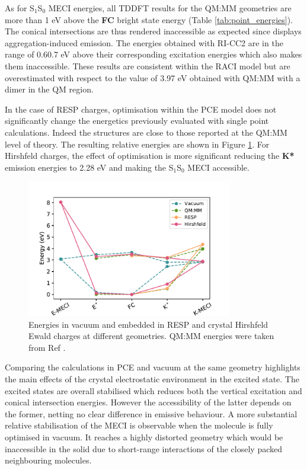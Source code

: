 As for S$_1$\textendash{}S$_0$ MECI energies, all TDDFT results for the QM:MM geometries are more than 1 eV above the \textbf{FC} bright state energy (Table \ref{tab:point_energies}). The conical intersections are thus rendered inaccessible as expected since \HC{} displays aggregation-induced emission. The energies obtained with RI-CC2 are in the range of 0.6\textendash{}0.7 eV above their corresponding excitation energies which also makes them inaccessible. These results are consistent within the RACI model but are overestimated with respect to the value of 3.97 eV obtained with QM:MM with a dimer in the QM region.\cite{Dommett2017c}

In the case of RESP charges, optimisation within the PCE model does not significantly change the energetics previously evaluated with single point calculations. Indeed the structures are close to those reported at the QM:MM level of theory. The resulting relative energies are shown in Figure \ref{fig:pts_n_vac}. For Hirshfeld charges, the effect of optimisation is more significant reducing the \textbf{K*} emission energies to 2.28 eV and making the S$_1$\textendash{}S$_0$ MECI accessible.


\begin{figure}
\centering
\includegraphics[width=9cm]{Chapters/5Ewald/Energies_Figure.pdf}
\caption{Energies \HC{} in vacuum and embedded in RESP and crystal Hirshfeld Ewald charges at different geometries. QM:MM energies were taken from Ref .}
\label{fig:pts_n_vac}
\end{figure}

Comparing the calculations in PCE and vacuum at the same geometry highlights the main effects of the crystal electrostatic environment in the excited state. The excited states are overall stabilised which reduces both the vertical excitation and conical intersection energies. However the accessibility of the latter depends on the former, netting no clear difference in emissive behaviour. A more substantial relative stabilisation of the MECI is observable when the molecule is fully optimised in vacuum. It reaches a highly distorted geometry which would be inaccessible in the solid due to short-range interactions of the closely packed neighbouring molecules.

